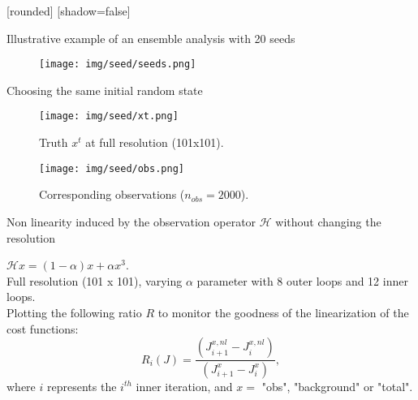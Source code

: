 \documentclass[francais]{beamer}
\title[Nicolas Baillot d'Etivaux]{}
\begin{document}
[rounded]%
[shadow=false]



\begin{frame}{Illustrative example of an ensemble analysis with 20 seeds}
\begin{center}
\begin{figure}
\texttt{[image: img/seed/seeds.png]}
\end{figure}
\end{center}
\end{frame}

\begin{frame}{Choosing the same initial random state}
\begin{center}
\begin{figure}
  \texttt{[image: img/seed/xt.png]}
  \caption{Truth $x^t$ at full resolution (101x101).}
\endminipage\hfill
{}
  \texttt{[image: img/seed/obs.png]}
  \caption{Corresponding observations ($n_{obs}=2000$).}
\endminipage
\end{figure}
\end{center}
\end{frame}



\begin{frame}{Non linearity induced by the observation operator $\mathcal{H}$ without changing the resolution}
\begin{center}
$\mathcal{H}x = (1-\alpha) x+ \alpha x^3$.\\
\vspace{+0.5cm}
Full resolution (101 x 101), varying $\alpha$ parameter with 8 outer loops and 12 inner loops.\\
\vspace{+0.5cm}
Plotting the following ratio $R$ to monitor the goodness of the linearization of the cost functions:\\
$$R_i(J) = \dfrac{(J^{x,nl}_{i+1} - J^{x,nl}_i)}{(J^x_{i+1} - J^x_i)}, $$
where $i$ represents the $i^{th}$ inner iteration, and $x=$ "obs", "background" or "total".
\end{center}
\end{frame}

\end{document}
